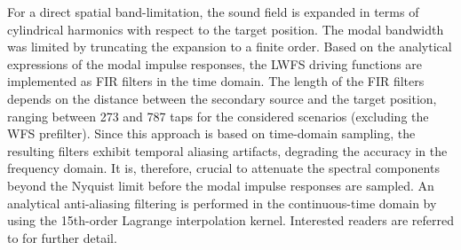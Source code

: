 For a direct spatial band-limitation,
the sound field is expanded in terms of cylindrical harmonics with respect to the target position.
The modal bandwidth was limited by truncating the expansion to a finite order.
Based on the analytical expressions of the modal impulse responses,
the LWFS driving functions are implemented as FIR filters in the time domain.
The length of the FIR filters depends on the distance between the secondary source and the target position,
ranging between 273 and 787 taps for the considered scenarios
(excluding the WFS prefilter).
%
Since this approach is based on time-domain sampling,
the resulting filters exhibit temporal aliasing artifacts,
degrading the accuracy in the frequency domain.
It is, therefore, crucial to attenuate the spectral components beyond the Nyquist limit
before the modal impulse responses are sampled.
An analytical anti-aliasing filtering is performed in the continuous-time domain
by using the 15th-order Lagrange interpolation kernel.
%
Interested readers are referred to \cite{hahn2022cylindrical} for further detail.
